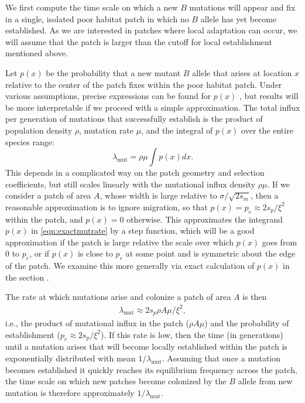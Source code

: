 \documentclass[10pt,letterpaper]{article}
\newcommand{\citep}[1]{\cite{#1}}
\newcommand{\mutrate}{\lambda_\text{mut}}
\newcommand{\secref}[1]{{\emph{\nameref{#1}}}}
\begin{document}
We first compute the time scale on which a new $B$ mutations will appear and fix in 
a single, isolated poor habitat patch in which no $B$ allele has yet become established. 
As we are interested in patches where local adaptation can occur,
we will assume that the patch is larger than the cutoff for local establishment 
mentioned above.

Let $p(x)$ be the probability that a new mutant $B$ allele that arises at location $x$
relative to the center of the patch fixes within the poor habitat patch.
Under various assumptions, precise expressions can be found for $p(x)$ \citep{barton1987establishment},
but results will be more interpretable if we proceed with a simple approximation.
The total influx per generation of mutations that successfully establish is 
the product of population density $\rho$, mutation rate $\mu$, and the
integral of $p(x)$ over the entire species range:
\begin{equation}
  \mutrate = \rho \mu \int p(x) dx \label{eqn:exactmutrate} .
\end{equation}
This depends in a complicated way on the patch geometry and selection coefficients,
but still scales linearly with the mutational influx density $\rho \mu$.
If we consider a patch of area $A$, whose width is large relative to $\sigma/\sqrt{2s_m}$, 
then a reasonable approximation is to ignore migration, 
so that $p(x) = p_e \approx 2 s_p / \xi^2$ within the patch, and $p(x) = 0$ otherwise.
This approximates the integrand $p(x)$ in \eqref{eqn:exactmutrate} by a step function,
which will be a good approximation if the patch is large relative the scale over which $p(x)$ goes from 0 to $p_e$,
or if $p(x)$ is close to $p_e$ at some point and is symmetric about the edge of the patch. 
We examine this more generally via exact calculation of $p(x)$ in the section \secref{apx:establishment_sims}.

The rate at which mutations arise and colonize a patch of area $A$ is then
\begin{align} \label{eqn:mutrate} 
  \mutrate %
  \approx 2 s_p \rho A \mu / \xi^2,  
\end{align}
i.e., the product of mutational influx in the patch ($\rho A\mu$) and the probability of establishment ($p_e \approx 2s_p/\xi^2$).
If this rate is low, then the time (in generations) until a mutation arises that
will become locally established within the patch is exponentially distributed with mean $1/\mutrate$.  
Assuming that once a mutation becomes established it quickly reaches its equilibrium frequency across the patch, 
the time scale on which new patches become colonized by the $B$ allele from new mutation is therefore approximately $1/\mutrate$.
\end{document}

